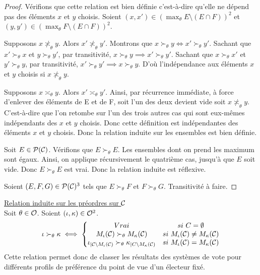 \begin{proof}
	Vérifions que cette relation est bien définie c'est-à-dire qu'elle ne dépend pas des éléments $x$ et $y$ choisis.
	Soient $(x, x') \in \left( \max_\theta E \setminus (E \cap F) \right)^2$ et $(y, y') \in \left( \max_\theta F \setminus (E \cap F) \right)^2$.
	
	Supposons $x \not \asymp_\theta y$. Alors $x' \not \asymp_\theta y'$.
	Montrons que $x \succ_\theta y \iff x' \succ_\theta y'$.
	Sachant que $x' \succ_\theta x$ et $y \succ_\theta y'$, par transitivité, $x \succ_\theta y \implies x' \succ_\theta y'$.
	Sachant que $x \succ_\theta x'$ et $y' \succ_\theta y$, par transitivité, $x' \succ_\theta y' \implies x \succ_\theta y$. D'où l'indépendance aux éléments $x$ et $y$ choisis si $x \not \asymp_\theta y$.
	
	Supposons $x \asymp_\theta y$. Alors $x' \asymp_\theta y'$. Ainsi, par récurrence immédiate, à force d'enlever des éléments de E et de F, soit l'un des deux devient vide soit $x \not \asymp_\theta y$.
	C'est-à-dire que l'on retombe sur l'un des trois autres cas qui sont eux-mêmes indépendants des $x$ et $y$ choisis. Donc cette définition est indépendantes des éléments $x$ et $y$ choisis. Donc la relation induite sur les ensembles est bien définie.
	
	Soit $E \in \mathcal{P}(\mathcal{C})$. Vérifions que $E \succ_\theta E$. Les ensembles dont on prend les maximum sont égaux. Ainsi, on applique récursivement le quatrième cas, jusqu'à que $E$ soit vide. Donc $E \succ_\theta E$ est vrai. Donc la relation induite est réflexive.
	
	Soient $(E, F, G) \in \mathcal{P}(\mathcal{C})^3$ tels que $E \succ_\theta F$ et $F \succ_\theta G$. Transitivité à faire.
\end{proof}

\begin{definition}
	\underline{Relation induite sur les préordres sur $\mathcal{C}$} \\
	Soit $\theta \in \mathcal{O}$. Soient $(\iota, \kappa) \in \mathcal{O}^2$.
	\begin{equation}
		\iota \succ_\theta \kappa \iff
		\left\{ \begin{matrix}
			Vrai &si \ C = \emptyset \\
			M_\iota(\mathcal{C}) \succ_\theta M_\kappa(\mathcal{C}) &si \ M_\iota(\mathcal{C}) \neq M_\kappa(\mathcal{C}) \\
			\iota_{|\mathcal{C} \setminus M_\iota(\mathcal{C})} \succ_\theta \kappa_{|C \setminus M_\kappa(\mathcal{C})} &si \ M_\iota(\mathcal{C}) = M_\kappa(\mathcal{C})
		\end{matrix} \right.
	\end{equation}
	Cette relation permet donc de classer les résultats des systèmes de vote pour différents profils de préférence du point de vue d'un électeur fixé.
\end{definition}

